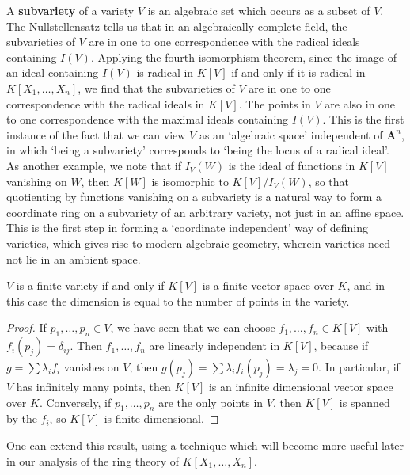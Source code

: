 A {\bf subvariety} of a variety $V$ is an algebraic set which occurs as a subset of $V$. The Nullstellensatz tells us that in an algebraically complete field, the subvarieties of $V$ are in one to one correspondence with the radical ideals containing $I(V)$. Applying the fourth isomorphism theorem, since the image of an ideal containing $I(V)$ is radical in $K[V]$ if and only if it is radical in $K[X_1,\dots,X_n]$, we find that the subvarieties of $V$ are in one to one correspondence with the radical ideals in $K[V]$. The points in $V$ are also in one to one correspondence with the maximal ideals containing $I(V)$. This is the first instance of the fact that we can view $V$ as an `algebraic space' independent of $\mathbf{A}^n$, in which `being a subvariety' corresponds to `being the locus of a radical ideal'. As another example, we note that if $I_V(W)$ is the ideal of functions in $K[V]$ vanishing on $W$, then $K[W]$ is isomorphic to $K[V]/I_V(W)$, so that quotienting by functions vanishing on a subvariety is a natural way to form a coordinate ring on a subvariety of an arbitrary variety, not just in an affine space. This is the first step in forming a `coordinate independent' way of defining varieties, which gives rise to modern algebraic geometry, wherein varieties need not lie in an ambient space.

\begin{prop}
    $V$ is a finite variety if and only if $K[V]$ is a finite vector space over $K$, and in this case the dimension is equal to the number of points in the variety.
\end{prop}
\begin{proof}
    If $p_1, \dots, p_n \in V$, we have seen that we can choose $f_1, \dots, f_n \in K[V]$ with $f_i(p_j) = \delta_{ij}$. Then $f_1, \dots, f_n$ are linearly independent in $K[V]$, because if $g = \sum \lambda_i f_i$ vanishes on $V$, then $g(p_j) = \sum \lambda_i f_i(p_j) = \lambda_j = 0$. In particular, if $V$ has infinitely many points, then $K[V]$ is an infinite dimensional vector space over $K$. Conversely, if $p_1, \dots, p_n$ are the only points in $V$, then $K[V]$ is spanned by the $f_i$, so $K[V]$ is finite dimensional.
\end{proof}

One can extend this result, using a technique which will become more useful later in our analysis of the ring theory of $K[X_1, \dots, X_n]$.

